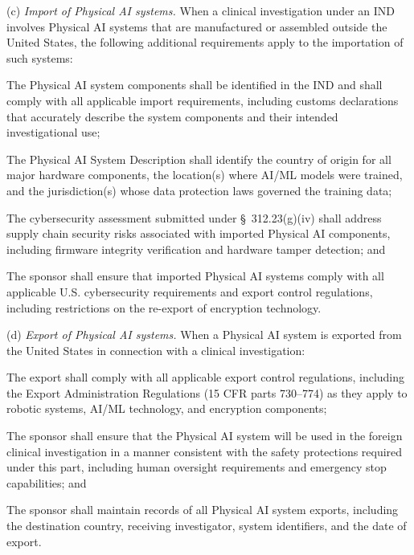 \documentclass[11pt]{article}
\begin{document}
(c) \textit{Import of Physical AI systems.} When a clinical investigation under an IND involves Physical AI systems that are manufactured or assembled outside the United States, the following additional requirements apply to the importation of such systems:

\begin{description}[leftmargin=0.8cm,style=sameline]
\item[(i)] The Physical AI system components shall be identified in the IND and shall comply with all applicable import requirements, including customs declarations that accurately describe the system components and their intended investigational use;
\item[(ii)] The Physical AI System Description shall identify the country of origin for all major hardware components, the location(s) where AI/ML models were trained, and the jurisdiction(s) whose data protection laws governed the training data;
\item[(iii)] The cybersecurity assessment submitted under \S~312.23(g)(iv) shall address supply chain security risks associated with imported Physical AI components, including firmware integrity verification and hardware tamper detection; and
\item[(iv)] The sponsor shall ensure that imported Physical AI systems comply with all applicable U.S. cybersecurity requirements and export control regulations, including restrictions on the re-export of encryption technology.
\end{description}

(d) \textit{Export of Physical AI systems.} When a Physical AI system is exported from the United States in connection with a clinical investigation:

\begin{description}[leftmargin=0.8cm,style=sameline]
\item[(i)] The export shall comply with all applicable export control regulations, including the Export Administration Regulations (15 CFR parts 730--774) as they apply to robotic systems, AI/ML technology, and encryption components;
\item[(ii)] The sponsor shall ensure that the Physical AI system will be used in the foreign clinical investigation in a manner consistent with the safety protections required under this part, including human oversight requirements and emergency stop capabilities; and
\item[(iii)] The sponsor shall maintain records of all Physical AI system exports, including the destination country, receiving investigator, system identifiers, and the date of export.
\end{description}
\end{document}
